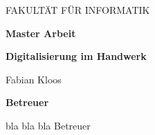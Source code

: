 \thispagestyle{empty}

\begin{titlepage}

\vspace{3cm}

\begin{center}
\end{center}

\vspace{2.5cm}

\begin{center}
  \Large FAKULTÄT FÜR INFORMATIK
\end{center}

\vspace{1cm}
\begin{center}
	\Huge
	\textbf{Master Arbeit}\\
\end{center}

\vspace{1cm}

\begin{center}
	\Large
	\textbf{Digitalisierung im Handwerk}
\end{center}

\vspace{1.5cm}

\begin{center}
	\Large
	Fabian Kloos
\end{center}

\vspace{3.5cm}

\begin{center}
    \large
	\textbf{Betreuer}
\end{center}

\vspace{0.3cm}

\begin{center}
    \large
    bla bla bla Betreuer
\end{center}

\newpage
\thispagestyle{empty}
\mbox{}
\end{titlepage}
